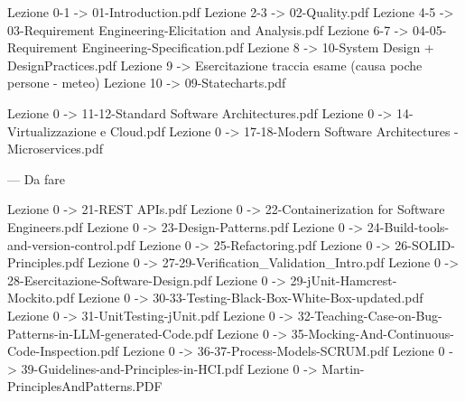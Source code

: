 
Lezione 0-1 -> 01-Introduction.pdf
Lezione 2-3 -> 02-Quality.pdf
Lezione 4-5 -> 03-Requirement Engineering-Elicitation and Analysis.pdf
Lezione 6-7 ->  04-05-Requirement Engineering-Specification.pdf
Lezione 8 ->  10-System Design + DesignPractices.pdf
Lezione 9 -> Esercitazione traccia esame (causa poche persone - meteo)
Lezione 10 ->  09-Statecharts.pdf

Lezione 0 ->  11-12-Standard Software Architectures.pdf
Lezione 0 ->  14-Virtualizzazione e Cloud.pdf
Lezione 0 ->  17-18-Modern Software Architectures - Microservices.pdf


 --- Da fare


Lezione 0 ->  21-REST APIs.pdf
Lezione 0 ->  22-Containerization for Software Engineers.pdf
Lezione 0 ->  23-Design-Patterns.pdf
Lezione 0 ->  24-Build-tools-and-version-control.pdf
Lezione 0 ->  25-Refactoring.pdf
Lezione 0 ->  26-SOLID-Principles.pdf
Lezione 0 ->  27-29-Verification_Validation_Intro.pdf
Lezione 0 ->  28-Esercitazione-Software-Design.pdf
Lezione 0 ->  29-jUnit-Hamcrest-Mockito.pdf
Lezione 0 ->  30-33-Testing-Black-Box-White-Box-updated.pdf
Lezione 0 ->  31-UnitTesting-jUnit.pdf
Lezione 0 ->  32-Teaching-Case-on-Bug-Patterns-in-LLM-generated-Code.pdf
Lezione 0 ->  35-Mocking-And-Continuous-Code-Inspection.pdf
Lezione 0 ->  36-37-Process-Models-SCRUM.pdf
Lezione 0 ->  39-Guidelines-and-Principles-in-HCI.pdf
Lezione 0 ->  Martin-PrinciplesAndPatterns.PDF


